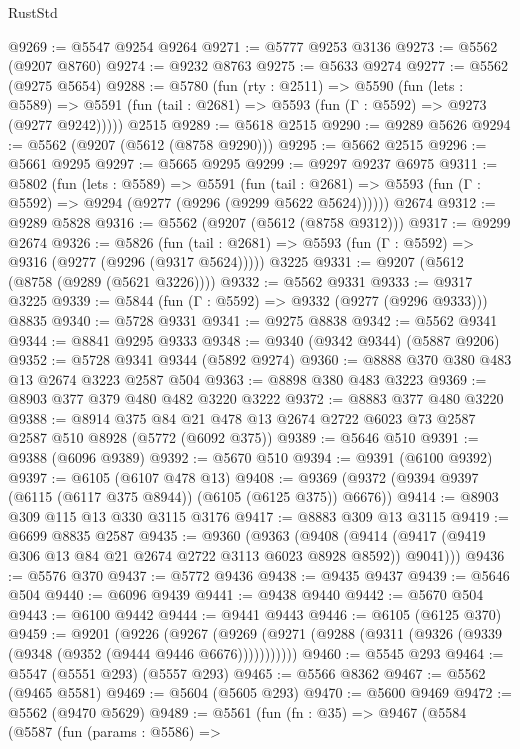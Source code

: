 \begin{lexlean}{RustStd}
\begin{coremodule}
@9269 := @5547 @9254 @9264
@9271 := @5777 @9253 @3136
@9273 := @5562 (@9207 @8760)
@9274 := @9232 @8763
@9275 := @5633 @9274
@9277 := @5562 (@9275 @5654)
@9288 := @5780
    (fun (rty : @2511) =>
    @5590
      (fun (lets : @5589) =>
      @5591 (fun (tail : @2681) => @5593 (fun (Γ : @5592) => @9273 (@9277 @9242)))))
    @2515
@9289 := @5618 @2515
@9290 := @9289 @5626
@9294 := @5562 (@9207 (@5612 (@8758 @9290)))
@9295 := @5662 @2515
@9296 := @5661 @9295
@9297 := @5665 @9295
@9299 := @9297 @9237 @6975
@9311 := @5802
    (fun (lets : @5589) =>
    @5591
      (fun (tail : @2681) => @5593 (fun (Γ : @5592) => @9294 (@9277 (@9296 (@9299 @5622 @5624))))))
    @2674
@9312 := @9289 @5828
@9316 := @5562 (@9207 (@5612 (@8758 @9312)))
@9317 := @9299 @2674
@9326 := @5826
    (fun (tail : @2681) => @5593 (fun (Γ : @5592) => @9316 (@9277 (@9296 (@9317 @5624)))))
    @3225
@9331 := @9207 (@5612 (@8758 (@9289 (@5621 @3226))))
@9332 := @5562 @9331
@9333 := @9317 @3225
@9339 := @5844 (fun (Γ : @5592) => @9332 (@9277 (@9296 @9333))) @8835
@9340 := @5728 @9331
@9341 := @9275 @8838
@9342 := @5562 @9341
@9344 := @8841 @9295 @9333
@9348 := @9340 (@9342 @9344) (@5887 @9206)
@9352 := @5728 @9341 @9344 (@5892 @9274)
@9360 := @8888 @370 @380 @483 @13 @2674 @3223 @2587 @504
@9363 := @8898 @380 @483 @3223
@9369 := @8903 @377 @379 @480 @482 @3220 @3222
@9372 := @8883 @377 @480 @3220
@9388 := @8914
    @375
    @84
    @21
    @478
    @13
    @2674
    @2722
    @6023
    @73
    @2587
    @2587
    @510
    @8928
    (@5772 (@6092 @375))
@9389 := @5646 @510
@9391 := @9388 (@6096 @9389)
@9392 := @5670 @510
@9394 := @9391 (@6100 @9392)
@9397 := @6105 (@6107 @478 @13)
@9408 := @9369 (@9372 (@9394 @9397 (@6115 (@6117 @375 @8944)) (@6105 (@6125 @375)) @6676))
@9414 := @8903 @309 @115 @13 @330 @3115 @3176
@9417 := @8883 @309 @13 @3115
@9419 := @6699 @8835 @2587
@9435 := @9360
    (@9363
      (@9408 (@9414 (@9417 (@9419 @306 @13 @84 @21 @2674 @2722 @3113 @6023 @8928 @8592)) @9041)))
@9436 := @5576 @370
@9437 := @5772 @9436
@9438 := @9435 @9437
@9439 := @5646 @504
@9440 := @6096 @9439
@9441 := @9438 @9440
@9442 := @5670 @504
@9443 := @6100 @9442
@9444 := @9441 @9443
@9446 := @6105 (@6125 @370)
@9459 := @9201
    (@9226
      (@9267 (@9269 (@9271 (@9288 (@9311 (@9326 (@9339 (@9348 (@9352 (@9444 @9446 @6676)))))))))))
@9460 := @5545 @293
@9464 := @5547 (@5551 @293) (@5557 @293)
@9465 := @5566 @8362
@9467 := @5562 (@9465 @5581)
@9469 := @5604 (@5605 @293)
@9470 := @5600 @9469
@9472 := @5562 (@9470 @5629)
@9489 := @5561
    (fun (fn : @35) =>
    @9467
      (@5584
        (@5587
          (fun (params : @5586) =>

\end{coremodule}
\end{lexlean}
